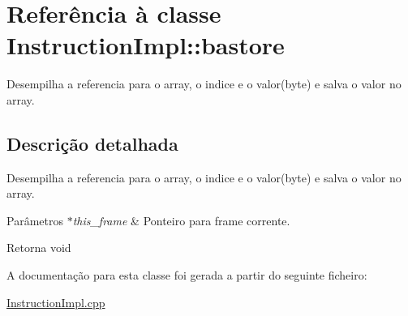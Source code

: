 \hypertarget{class_instruction_impl_1_1bastore}{}\section{Referência à classe Instruction\+Impl\+:\+:bastore}
\label{class_instruction_impl_1_1bastore}


Desempilha a referencia para o array, o indice e o valor(byte) e salva o valor no array.  




\subsection{Descrição detalhada}
Desempilha a referencia para o array, o indice e o valor(byte) e salva o valor no array. 


\begin{DoxyParams}{Parâmetros}
{\em $\ast$this\+\_\+frame} & Ponteiro para frame corrente. \\
\hline
\end{DoxyParams}
\begin{DoxyReturn}{Retorna}
void 
\end{DoxyReturn}


A documentação para esta classe foi gerada a partir do seguinte ficheiro\+:\begin{DoxyCompactItemize}
\item 
\hyperlink{_instruction_impl_8cpp}{Instruction\+Impl.\+cpp}\end{DoxyCompactItemize}
